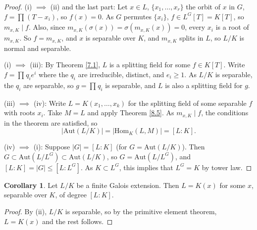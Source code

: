 \documentclass{article}
\theoremstyle{definition}
\newtheorem{cor}[theorem]{Corollary}
\begin{document}
\begin{proof}
    (i) $\implies $ (ii) and the last part: Let $x \in L$, $\{x_1,\ldots,x_r\}$ the orbit of $x$ in $G$, $f = \prod_{}^{} (T-x_i)$, so $f(x)=0$. As $G$ permutes $\{x_i\}$, $f \in L^G[T] = K[T]$, so $m_{x,K} \mid f$. Also, since $m_{x,K}(\sigma(x)) = \sigma(m_{x,K}(x))=0$, every $x_i$ is a root of $m_{x,K}$. So $f = m_{x,K}$, and $x$ is separable over $K$, and $m_{x,K}$ splits in $L$, so $L/K$ is normal and separable.
    \vspace{1mm}
    
    (i) $\implies$ (iii): By Theorem \ref{7.1}, $L$ is a splitting field for some $f \in K[T]$. Write $f = \prod_{}^{} q_ie^i$ where the $q_i$ are irreducible, distinct, and $e_i \ge 1$. As $L/K$ is separable, the $q_i$ are separable, so $g= \prod_{}^{} q_i$ is separable, and $L$ is also a splitting field for $g$.
    \vspace{1mm}
    
    (iii) $\implies$ (iv): Write $L=K(x_1,\ldots,x_k)$ for the splitting field of some separable $f$ with roots $x_i$. Take $M = L$ and apply Theorem \ref{8.5}. As $m_{x,K} \mid f$, the conditions in the theorem are satisfied, so $$|\text{Aut}(L/K)|=|\text{Hom}_K(L,M)|=[L : K].$$

    (iv) $\implies$ (i): Suppose $|G|=[L:K]$ (for $G = \text{Aut}(L/K)$). Then $G \subset \text{Aut}(L/L^G) \subset \text{Aut}(L/K)$, so $G = \text{Aut}(L/L^G)$, and $[L : K] = |G| \le [L : L^G]$. As $K \subset L^G$, this implies that $L^G = K$ by tower law.
\end{proof}
\begin{cor}\label{9.3}
    Let $L/K$ be a finite Galois extension. Then $L=K(x)$ for some $x$, separable over $K$, of degree $[L:K]$.
\end{cor}
\begin{proof}
    By (ii), $L/K$ is separable, so by the primitive element theorem, $L=K(x)$ and the rest follows.
\end{proof}
\end{document}
